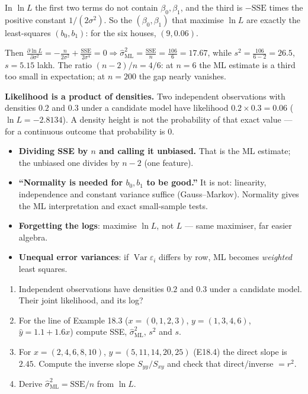 \documentclass[11pt]{article}
\begin{document}
\begin{worked}
In $\ln L$ the first two terms do not contain $\beta_0, \beta_1$, and the third
is $-\mathrm{SSE}$ times the positive constant $1/(2\sigma^2)$. So the
$(\beta_0, \beta_1)$ that maximise $\ln L$ are exactly the least-squares
$(b_0, b_1)$: for the six houses, $(9, 0.06)$.

Then
$\frac{\partial \ln L}{\partial\sigma^2} = -\frac{n}{2\sigma^2} +
\frac{\mathrm{SSE}}{2\sigma^4} = 0 \Rightarrow \hat\sigma^2_{\text{ML}} =
\frac{\mathrm{SSE}}{n} = \frac{106}{6} = 17.67$, while
$s^2 = \frac{106}{6 - 2} = 26.5$, $s = 5.15$ lakh. The ratio $(n-2)/n = 4/6$:
at $n = 6$ the ML estimate is a third too small in expectation; at $n = 200$
the gap nearly vanishes.

\textbf{Likelihood is a product of densities.} Two independent observations
with densities $0.2$ and $0.3$ under a candidate model have likelihood
$0.2 \times 0.3 = 0.06$ ($\ln L = -2.8134$). A density height is not the
probability of that exact value --- for a continuous outcome that probability
is $0$.
\end{worked}

\begin{caution}
\begin{itemize}
  \item \textbf{Dividing SSE by $n$ and calling it unbiased.} That is the ML
    estimate; the unbiased one divides by $n - 2$ (one feature).
  \item \textbf{``Normality is needed for $b_0, b_1$ to be good.''} It is not:
    linearity, independence and constant variance suffice (Gauss--Markov).
    Normality gives the ML interpretation and exact small-sample tests.
  \item \textbf{Forgetting the logs}: maximise $\ln L$, not $L$ --- same
    maximiser, far easier algebra.
  \item \textbf{Unequal error variances}: if $\operatorname{Var}\varepsilon_i$
    differs by row, ML becomes \emph{weighted} least squares.
\end{itemize}
\end{caution}

\begin{tryit}
\begin{enumerate}[label=\textbf{E19.\arabic*}]
  \item Independent observations have densities $0.2$ and $0.3$ under a
    candidate model. Their joint likelihood, and its log?
  \item For the line of Example 18.3 ($x = (0,1,2,3)$, $y = (1,3,4,6)$,
    $\hat y = 1.1 + 1.6x$) compute SSE, $\hat\sigma^2_{\text{ML}}$, $s^2$ and $s$.
  \item For $x = (2,4,6,8,10)$, $y = (5,11,14,20,25)$ (E18.4) the direct slope is
    $2.45$. Compute the inverse slope $S_{yy}/S_{xy}$ and check that
    direct/inverse $= r^2$.
  \item Derive $\hat\sigma^2_{\text{ML}} = \mathrm{SSE}/n$ from $\ln L$.
\end{enumerate}
\end{tryit}
\end{document}
